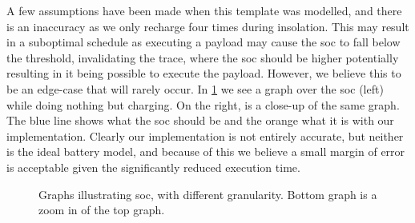A few assumptions have been made when this template was modelled, and there is an inaccuracy as we only recharge four times during insolation.
This may result in a suboptimal schedule as executing a payload may cause the \gls{soc} to fall below the threshold, invalidating the trace, where the \gls{soc} should be higher potentially resulting in it being possible to execute the payload.
However, we believe this to be an edge-case that will rarely occur.
In \cref{fig:granularity} we see a graph over the \gls{soc} (left) while doing nothing but charging.
On the right, is a close-up of the same graph.
The blue line shows what the \gls{soc} should be and the orange what it is with our implementation.
Clearly our implementation is not entirely accurate, but neither is the ideal battery model, and because of this we believe a small margin of error is acceptable given the significantly reduced execution time.

\begin{figure}[h]%
	\centering
	\qquad
	\caption{Graphs illustrating \gls{soc}, with different granularity. Bottom graph is a zoom in of the top graph.}
	\label{fig:granularity}%
\end{figure}

